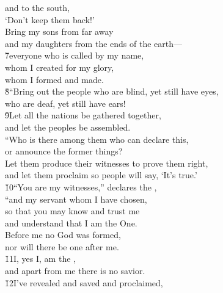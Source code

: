 \begin{poetry}
\poeml and to the south, \\
\poemll    `Don't keep them back!' \\
\poeml Bring my sons from far away \\
\poemll    and my daughters from the ends of the earth--- \\
\poeml \v{7}everyone who is called by my name, \\
\poemll    whom I created for my glory, \\
\poemlll       whom I formed and made. \\
\poeml \v{8}``Bring out the people who are blind, yet still have eyes, \\
\poemll    who are deaf, yet still have ears! \\
\poeml \v{9}Let all the nations be gathered together, \\
\poemll    and let the peoples be assembled. \\
\poeml ``Who is there among them who can declare this, \\
\poemll    or announce the former things? \\
\poeml Let them produce their witnesses to prove them right, \\
\poemll    and let them proclaim so people will say, `It's true.' \\
\poeml \v{10}``You are my witnesses,'' declares the , \\
\poemll    ``and my servant whom I have chosen, \\
\poeml so that you may know and trust me \\
\poemll    and understand that I am the One. \\
\poeml Before me no God was formed, \\
\poemll    nor will there be one after me. \\
\poeml \v{11}I, yes I, am the , \\
\poemll    and apart from me there is no savior. \\
\poeml \v{12}I've revealed and saved and proclaimed, \\

\end{poetry}
